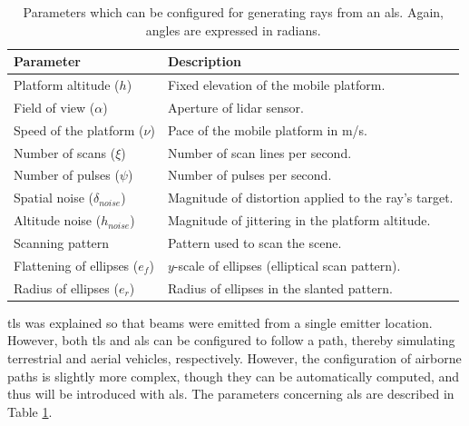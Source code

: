 \renewcommand{\arraystretch}{1.2}
\begin{table}
    \footnotesize
    \caption{Parameters which can be configured for generating rays from an \acrshort{als}. Again, angles are expressed in radians.}
    \label{table:als_parameters}
    \centering
    \begin{tabular}{ll}
    \toprule
    \textbf{Parameter} & \textbf{Description} \\
    \midrule
    Platform altitude ($h$) & Fixed elevation of the mobile platform.\\
    Field of view ($\alpha$) & Aperture of \acrshort{lidar} sensor. \\
    Speed of the platform ($\nu$) & Pace of the mobile platform in \si{\meter/\second}. \\
    Number of scans ($\xi$) & Number of scan lines per second. \\
    Number of pulses ($\psi$) & Number of pulses per second. \\
    Spatial noise ($\delta_{\textit{noise}}$) & Magnitude of distortion applied to the ray's target.\\
    Altitude noise ($h_{\textit{noise}}$) & Magnitude of jittering in the platform altitude.\\
    Scanning pattern & Pattern used to scan the scene. \\
    Flattening of ellipses ($e_{f}$) & $y$-scale of ellipses (elliptical scan pattern). 
    \\
    Radius of ellipses ($e_{r}$) & Radius of ellipses in the slanted pattern.\\
    \bottomrule
    \end{tabular}
\end{table}
\renewcommand{\arraystretch}{1}

\acrshort{tls} was explained so that beams were emitted from a single emitter location. However, both \acrshort{tls} and \acrshort{als} can be configured to follow a path, thereby simulating terrestrial and aerial vehicles, respectively. However, the configuration of airborne paths is slightly more complex, though they can be automatically computed, and thus will be introduced with \acrshort{als}. The parameters concerning \acrshort{als} are described in Table \ref{table:als_parameters}.

